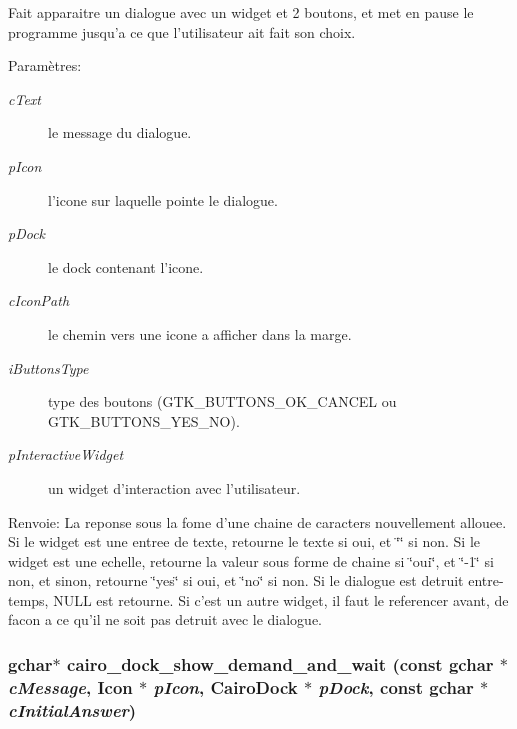 Fait apparaitre un dialogue avec un widget et 2 boutons, et met en pause le programme jusqu'a ce que l'utilisateur ait fait son choix. \begin{Desc}
\item[Param\`{e}tres:]
\begin{description}
\item[{\em c\-Text}]le message du dialogue. \item[{\em p\-Icon}]l'icone sur laquelle pointe le dialogue. \item[{\em p\-Dock}]le dock contenant l'icone. \item[{\em c\-Icon\-Path}]le chemin vers une icone a afficher dans la marge. \item[{\em i\-Buttons\-Type}]type des boutons (GTK\_\-BUTTONS\_\-OK\_\-CANCEL ou GTK\_\-BUTTONS\_\-YES\_\-NO). \item[{\em p\-Interactive\-Widget}]un widget d'interaction avec l'utilisateur. \end{description}
\end{Desc}
\begin{Desc}
\item[Renvoie:]La reponse sous la fome d'une chaine de caracters nouvellement allouee. Si le widget est une entree de texte, retourne le texte si oui, et \char`\"{}\char`\"{} si non. Si le widget est une echelle, retourne la valeur sous forme de chaine si \char`\"{}oui\char`\"{}, et \char`\"{}-1\char`\"{} si non, et sinon, retourne \char`\"{}yes\char`\"{} si oui, et \char`\"{}no\char`\"{} si non. Si le dialogue est detruit entre-temps, NULL est retourne. Si c'est un autre widget, il faut le referencer avant, de facon a ce qu'il ne soit pas detruit avec le dialogue. \end{Desc}
\subsubsection{\setlength{\rightskip}{0pt plus 5cm}gchar$\ast$ cairo\_\-dock\_\-show\_\-demand\_\-and\_\-wait (const gchar $\ast$ {\em c\-Message}, {\bf Icon} $\ast$ {\em p\-Icon}, {\bf Cairo\-Dock} $\ast$ {\em p\-Dock}, const gchar $\ast$ {\em c\-Initial\-Answer})}\label{cairo-dock-dialogs_8c_d37448b4902e3bd0c5e51530643d4603}


